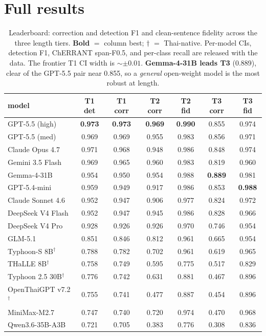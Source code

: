 \documentclass[11pt]{article}
\begin{document}
\section{Full results}
\label{app:results}
\begin{table}[t]
\centering\small
\begin{tabular}{@{}lcccccc@{}}
\toprule
model & T1 det & T1 corr & T2 corr & T2 fid & T3 corr & T3 fid \\
\midrule
GPT-5.5 (high)        & \textbf{0.973} & \textbf{0.973} & \textbf{0.969} & \textbf{0.990} & 0.855 & 0.974 \\
GPT-5.5 (med)         & 0.969 & 0.969 & 0.955 & 0.983 & 0.856 & 0.971 \\
Claude Opus 4.7       & 0.971 & 0.968 & 0.948 & 0.986 & 0.848 & 0.974 \\
Gemini 3.5 Flash      & 0.969 & 0.965 & 0.960 & 0.983 & 0.819 & 0.960 \\
Gemma-4-31B           & 0.954 & 0.950 & 0.954 & 0.988 & \textbf{0.889} & 0.981 \\
GPT-5.4-mini          & 0.959 & 0.949 & 0.917 & 0.986 & 0.853 & \textbf{0.988} \\
Claude Sonnet 4.6     & 0.952 & 0.947 & 0.906 & 0.977 & 0.824 & 0.972 \\
DeepSeek V4 Flash     & 0.952 & 0.947 & 0.945 & 0.986 & 0.828 & 0.966 \\
DeepSeek V4 Pro       & 0.928 & 0.926 & 0.926 & 0.970 & 0.746 & 0.954 \\
GLM-5.1               & 0.851 & 0.846 & 0.812 & 0.961 & 0.665 & 0.954 \\
Typhoon-S 8B$^\dagger$         & 0.788 & 0.782 & 0.702 & 0.961 & 0.619 & 0.965 \\
THaLLE 8B$^\dagger$            & 0.758 & 0.749 & 0.595 & 0.775 & 0.517 & 0.829 \\
Typhoon 2.5 30B$^\dagger$      & 0.776 & 0.742 & 0.631 & 0.881 & 0.467 & 0.896 \\
OpenThaiGPT v7.2$^\dagger$     & 0.755 & 0.741 & 0.477 & 0.887 & 0.454 & 0.896 \\
MiniMax-M2.7          & 0.747 & 0.740 & 0.720 & 0.974 & 0.470 & 0.968 \\
Qwen3.6-35B-A3B       & 0.721 & 0.705 & 0.383 & 0.776 & 0.308 & 0.836 \\
\bottomrule
\end{tabular}
\caption{Leaderboard: correction and detection F1 and clean-sentence fidelity across the three
length tiers. \textbf{Bold} $=$ column best; $\dagger$ $=$ Thai-native. Per-model CIs, detection
F1, ChERRANT span-F0.5, and per-class recall are released with the data. The frontier T1 CI width
is $\sim\pm0.01$. \textbf{Gemma-4-31B leads T3} (0.889), clear of the GPT-5.5 pair near
0.855, so a \emph{general} open-weight model is the most robust at length.}
\label{tab:leaderboard}
\end{table}
\end{document}
